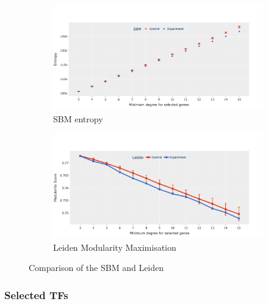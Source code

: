 \begin{figure}[!htb]
    \captionsetup[subfigure]{justification=Centering}
    \begin{subfigure}[!t]{1.0\textwidth}
        \includegraphics[width=\textwidth]{Sections/Network_I/Resources/selective_pruning/sbm_ent_sel_prun.png}
        \caption{SBM entropy}
    \end{subfigure}\hspace{\fill} %

    \bigskip %
    \begin{subfigure}[!t]{1.0\textwidth}
        \includegraphics[width=\linewidth]{Sections/Network_I/Resources/selective_pruning/leid_mod_sel_prun.png}
        \caption{Leiden Modularity Maximisation}
    \end{subfigure}\hspace{\fill} %

    \caption{Comparison of the SBM and Leiden}
    \label{fig:N_I:gene_sel}
\end{figure}



\subsubsection{Selected TFs}


